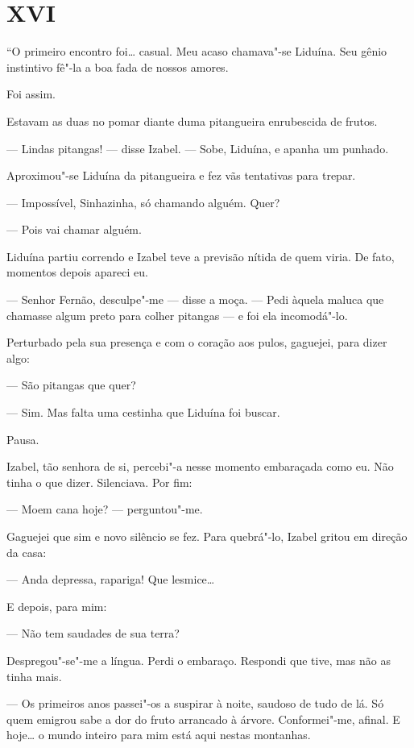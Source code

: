 \section*{XVI}

``O primeiro encontro foi\ldots{} casual. Meu acaso chamava"-se Liduína. Seu
gênio instintivo fê"-la a boa fada de nossos amores.

Foi assim.

Estavam as duas no pomar diante duma pitangueira enrubescida de frutos.

--- Lindas pitangas! --- disse Izabel. --- Sobe, Liduína, e apanha um
punhado.

Aproximou"-se Liduína da pitangueira e fez vãs tentativas para trepar.

--- Impossível, Sinhazinha, só chamando alguém. Quer?

--- Pois vai chamar alguém.

Liduína partiu correndo e Izabel teve a previsão nítida de quem viria.
De fato, momentos depois apareci eu.

--- Senhor Fernão, desculpe"-me --- disse a moça. --- Pedi àquela maluca
que chamasse algum preto para colher pitangas --- e foi ela incomodá"-lo.

Perturbado pela sua presença e com o coração aos pulos, gaguejei, para
dizer algo:

--- São pitangas que quer?

--- Sim. Mas falta uma cestinha que Liduína foi buscar.

Pausa.

Izabel, tão senhora de si, percebi"-a nesse momento embaraçada como eu.
Não tinha o que dizer. Silenciava. Por fim:

--- Moem cana hoje? --- perguntou"-me.

Gaguejei que sim e novo silêncio se fez. Para quebrá"-lo, Izabel gritou
em direção da casa:

--- Anda depressa, rapariga! Que lesmice\ldots{}

E depois, para mim:

--- Não tem saudades de sua terra?

Despregou"-se"-me a língua. Perdi o embaraço. Respondi que tive, mas não
as tinha mais.

--- Os primeiros anos passei"-os a suspirar à noite, saudoso de tudo de
lá. Só quem emigrou sabe a dor do fruto arrancado à árvore.
Conformei"-me, afinal. E hoje\ldots{} o mundo inteiro para mim está aqui
nestas montanhas.

